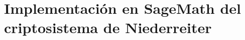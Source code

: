 \chapter[Implementación en SageMath del criptosistema de Niederreiter]{Implementación en SageMath del criptosistema de Niederreiter}
\label{annex:sage-Niederreiter}